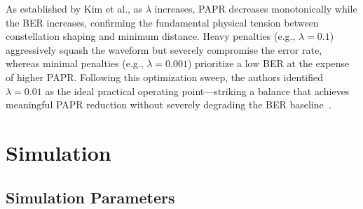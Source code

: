 \begin{enumerate}
          As established by Kim et al., as $\lambda$ increases, PAPR decreases monotonically while the BER increases, confirming the fundamental physical tension between constellation shaping and minimum distance. Heavy penalties (e.g., $\lambda = 0.1$) aggressively squash the waveform but severely compromise the error rate, whereas minimal penalties (e.g., $\lambda = 0.001$) prioritize a low BER at the expense of higher PAPR. Following this optimization sweep, the authors identified $\lambda = 0.01$ as the ideal practical operating point—striking a balance that achieves meaningful PAPR reduction without severely degrading the BER baseline~\cite{kim2017novel}.
\end{enumerate}


\newpage
\section{Simulation}
\label{sec:simulation}

\subsection{Simulation Parameters}

